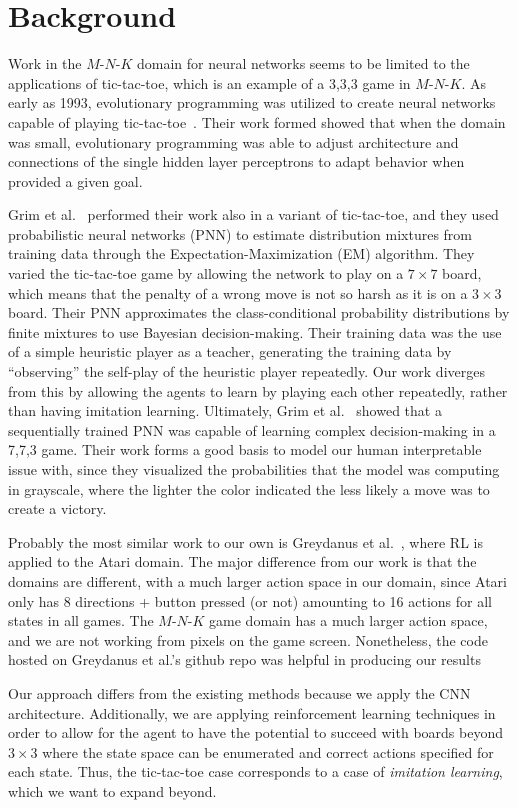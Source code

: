\section{Background}

Work in the $M$-$N$-$K$ domain for neural networks seems to be limited to the applications of tic-tac-toe, which is an example of a 3,3,3 game in $M$-$N$-$K$.
As early as 1993, evolutionary programming was utilized to create neural networks capable of playing tic-tac-toe~\cite{fogel1993using}.
Their work formed showed that when the domain was small, evolutionary programming was able to adjust architecture and connections of the single hidden layer perceptrons to adapt behavior when provided a given goal.

Grim et al.~\cite{grim2005probabilistic} performed their work also in a variant of tic-tac-toe, and they used probabilistic neural networks (PNN) to estimate distribution mixtures from training data through the Expectation-Maximization (EM) algorithm.
They varied the tic-tac-toe game by allowing the network to play on a $7 \times 7$ board, which means that the penalty of a wrong move is not so harsh as it is on a $3 \times 3$ board.
Their PNN approximates the class-conditional probability distributions by finite mixtures to use Bayesian decision-making.
Their training data was the use of a simple heuristic player as a teacher, generating the training data by ``observing'' the self-play of the heuristic player repeatedly.
Our work diverges from this by allowing the agents to learn by playing each other repeatedly, rather than having imitation learning.
Ultimately, Grim et al.~\cite{grim2005probabilistic} showed that a sequentially trained PNN was capable of learning complex decision-making in a 7,7,3 game.
Their work forms a good basis to model our human interpretable issue with, since they visualized the probabilities that the model was computing in grayscale, where the lighter the color indicated the less likely a move was to create a victory.

Probably the most similar work to our own is Greydanus et al.~\cite{greydanus}, where RL is applied to the Atari domain.
The major difference from our work is that the domains are different, with a much larger action space in our domain, since Atari only has 8 directions + button pressed (or not) amounting to 16 actions for all states in all games.
The $M$-$N$-$K$ game domain has a much larger action space, and we are not working from pixels on the game screen.
Nonetheless, the code hosted on Greydanus et al.'s github repo was helpful in producing our results

Our approach differs from the existing methods because we apply the CNN architecture.
Additionally, we are applying reinforcement learning techniques in order to allow for the agent to have the potential to succeed with boards beyond $3 \times 3$ where the state space can be enumerated and correct actions specified for each state.
Thus, the tic-tac-toe case corresponds to a case of \emph{imitation learning}, which we want to expand beyond.